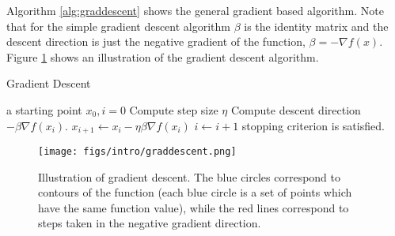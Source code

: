 Algorithm \ref{alg:graddescent} shows the general gradient based algorithm. Note that for the simple gradient descent algorithm $\beta$ is the identity matrix and the descent direction is just the negative gradient of the function, $\beta = -\nabla f(x)$. Figure \ref{fig:graddescent} shows an illustration of the gradient descent algorithm.

\begin{algorithm}[h]
\caption{Gradient Descent\label{alg:graddescent}}
\begin{algorithmic}[1]
 a starting point $x_{0}, i=0$
\STATE \quad Compute step size $\eta$
\STATE \quad Compute descent direction $- \beta\nabla f(x_{i})$.
\STATE \quad $x_{i+1} \leftarrow x_{i} - \eta\beta\nabla f(x_{i})$
\STATE \quad $i \leftarrow i + 1$
 stopping criterion is satisfied.
\end{algorithmic}
\end{algorithm}

\begin{figure}[h]
\begin{center}
   \texttt{[image: figs/intro/graddescent.png]}
 \caption{\label{fig:graddescent} Illustration of gradient descent. The blue circles correspond to contours of the function (each blue circle is a set of points which have the same function value), while the red lines correspond to steps taken in the negative gradient direction.}
\end{center}
\end{figure}



